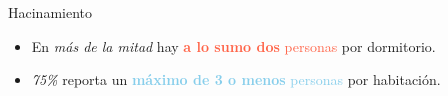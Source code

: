 \documentclass[aspectratio=169]{beamer}
\begin{document}
\begin{frame}{Hacinamiento}
\begin{minipage}{.65\linewidth}
\begin{overlayarea}{\linewidth}{.75\textheight}
            \end{overlayarea}
        \end{minipage}
        \begin{minipage}{.34\linewidth}
            \setlength{\leftmargini}{12pt}
            \begin{itemize}
                \item<2-> En \textit{más de la mitad} hay \textcolor{tomato}{\textbf{a lo sumo dos} personas} por dormitorio.
                \item<3-> \textit{75\%} reporta un \textcolor{skyblue}{\textbf{máximo de 3 o menos} personas} por habitación. 

            \end{itemize}
        \end{minipage}
    \end{frame}
\end{document}
